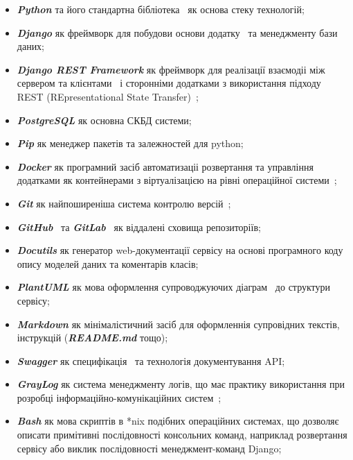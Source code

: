 \begin{itemize}
	\item  \textbf{\textit{Python}} та його стандартна бібліотека~\cite{hellmann2011python} як основа стеку технологій;
	\item  \textbf{\textit{Django}} як фреймворк для побудови основи додатку~\cite{rubio2017rest} та менеджменту бази даних;
	\item  \textbf{\textit{Django REST Framework}} як фреймворк для реалізації взаємодіі між сервером та клієнтами~\cite{hillar2018django} і сторонніми додатками з використання підходу REST (REpresentational State Transfer)~\cite{rubio2017rest};
	\item  \textbf{\textit{PostgreSQL}} як основна СКБД системи;
	\item  \textbf{\textit{Pip}} як менеджер пакетів та залежностей для python;
	\item  \textbf{\textit{Docker}} як програмний засіб автоматизаціі розвертання та управління додатками як контейнерами з віртуалізацією на рівні операційної системи~\cite{merkel2014docker};
	\item  \textbf{\textit{Git}} як найпоширеніша система контролю версій~\cite{torvalds2010git};
	\item  \textbf{\textit{GitHub}}~\cite{githubKSU} та \textbf{\textit{GitLab}}~\cite{gitlabKSU} як віддалені сховища репозиторіїв;
	\item  \textbf{\textit{Docutils}} як генератор web-документації сервісу на основі програмного коду опису моделей даних та коментарів класів;
	\item  \textbf{\textit{PlantUML}} як мова оформлення супроводжуючих діаграм~\cite{параничев2017опыт} до структури сервісу;
	\item  \textbf{\textit{Markdown}} як мінімалістичний засіб для оформленнія супровідних текстів, інструкцій (\textbf{\textit{README.md}} тощо);
	\item  \textbf{\textit{Swagger}} як специфікація~\cite{ed2018openapitouml} та технологія документування API;
	\item  \textbf{\textit{GrayLog}} як система менеджменту логів, що має практику використання при розробці інформаційно-комунікаційних систем~\cite{горбась2020програмний};
	\item  \textbf{\textit{Bash}} як мова скриптів в *nix подібних операційних системах, що дозволяє описати примітивні послідовності консольних команд, наприклад розвертання сервісу або виклик послідовності менеджмент-команд Django;
\end{itemize}




